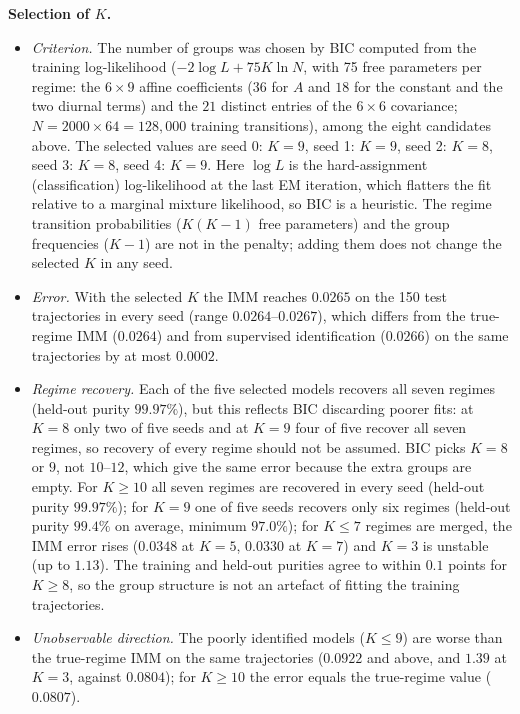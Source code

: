 \documentclass[conference]{IEEEtran}
\begin{document}
\textbf{Selection of $K$.}
\begin{itemize}
\item \emph{Criterion.} The number of groups was chosen by BIC computed from the training log-likelihood ($-2\log L+75K\ln N$, with 75 free parameters per regime: the $6\times9$ affine coefficients ($36$ for $A$ and $18$ for the constant and the two diurnal terms) and the $21$ distinct entries of the $6\times6$ covariance; $N=2000\times64=128{,}000$ training transitions), among the eight candidates above. The selected values are seed 0: $K=9$, seed 1: $K=9$, seed 2: $K=8$, seed 3: $K=8$, seed 4: $K=9$. Here $\log L$ is the hard-assignment (classification) log-likelihood at the last EM iteration, which flatters the fit relative to a marginal mixture likelihood, so BIC is a heuristic. The regime transition probabilities ($K(K-1)$ free parameters) and the group frequencies ($K-1$) are not in the penalty; adding them does not change the selected $K$ in any seed.
\item \emph{Error.} With the selected $K$ the IMM reaches $0.0265$ on the 150 test trajectories in every seed (range $0.0264$--$0.0267$), which differs from the true-regime IMM ($0.0264$) and from supervised identification ($0.0266$) on the same trajectories by at most $0.0002$.
\item \emph{Regime recovery.} Each of the five selected models recovers all seven regimes (held-out purity $99.97\%$), but this reflects BIC discarding poorer fits: at $K=8$ only two of five seeds and at $K=9$ four of five recover all seven regimes, so recovery of every regime should not be assumed. BIC picks $K=8$ or $9$, not $10$--$12$, which give the same error because the extra groups are empty. For $K\ge10$ all seven regimes are recovered in every seed (held-out purity $99.97\%$); for $K=9$ one of five seeds recovers only six regimes (held-out purity $99.4\%$ on average, minimum $97.0\%$); for $K\le7$ regimes are merged, the IMM error rises ($0.0348$ at $K=5$, $0.0330$ at $K=7$) and $K=3$ is unstable (up to $1.13$). The training and held-out purities agree to within $0.1$ points for $K\ge8$, so the group structure is not an artefact of fitting the training trajectories.
\item \emph{Unobservable direction.} The poorly identified models ($K\le9$) are worse than the true-regime IMM on the same trajectories ($0.0922$ and above, and $1.39$ at $K=3$, against $0.0804$); for $K\ge10$ the error equals the true-regime value ($0.0807$).
\end{itemize}
\end{document}
